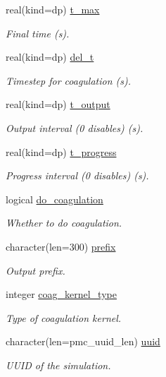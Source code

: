 \begin{DoxyCompactItemize}
\item 
real(kind=dp) \mbox{\hyperlink{structpmc__run__sect_1_1run__sect__opt__t_a958d9622aa7f51730fe3a361fcdf851e}{t\+\_\+max}}
\begin{DoxyCompactList}\small\item\em Final time (s). \end{DoxyCompactList}\item 
real(kind=dp) \mbox{\hyperlink{structpmc__run__sect_1_1run__sect__opt__t_ac63410cdff0a6ef461018022582c8778}{del\+\_\+t}}
\begin{DoxyCompactList}\small\item\em Timestep for coagulation (s). \end{DoxyCompactList}\item 
real(kind=dp) \mbox{\hyperlink{structpmc__run__sect_1_1run__sect__opt__t_a9d7540273911564670efb9d1effd3efd}{t\+\_\+output}}
\begin{DoxyCompactList}\small\item\em Output interval (0 disables) (s). \end{DoxyCompactList}\item 
real(kind=dp) \mbox{\hyperlink{structpmc__run__sect_1_1run__sect__opt__t_acc146f2b25cebbafc46ebdad698a3671}{t\+\_\+progress}}
\begin{DoxyCompactList}\small\item\em Progress interval (0 disables) (s). \end{DoxyCompactList}\item 
logical \mbox{\hyperlink{structpmc__run__sect_1_1run__sect__opt__t_a55237a1679eb6bdac0d9b3029fb32c91}{do\+\_\+coagulation}}
\begin{DoxyCompactList}\small\item\em Whether to do coagulation. \end{DoxyCompactList}\item 
character(len=300) \mbox{\hyperlink{structpmc__run__sect_1_1run__sect__opt__t_a5530b29a9c1c54823b9a2734b20d6525}{prefix}}
\begin{DoxyCompactList}\small\item\em Output prefix. \end{DoxyCompactList}\item 
integer \mbox{\hyperlink{structpmc__run__sect_1_1run__sect__opt__t_a816ff3ca2f5abf1ae9748946e76d0adf}{coag\+\_\+kernel\+\_\+type}}
\begin{DoxyCompactList}\small\item\em Type of coagulation kernel. \end{DoxyCompactList}\item 
character(len=pmc\+\_\+uuid\+\_\+len) \mbox{\hyperlink{structpmc__run__sect_1_1run__sect__opt__t_a270100565f29bae422e6bd3e4c37a6a0}{uuid}}
\begin{DoxyCompactList}\small\item\em U\+U\+ID of the simulation. \end{DoxyCompactList}\end{DoxyCompactItemize}


